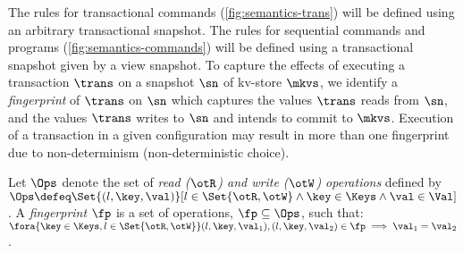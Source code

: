 The rules for transactional commands (\cref{fig:semantics-trans}) will be defined  using an arbitrary 
transactional snapshot. The rules for sequential
commands and programs (\cref{fig:semantics-commands}) will be defined  using a transactional
snapshot given by a view snapshot. 
To capture the effects of executing a transaction $\trans$ on a snapshot $\sn$ of kv-store $\mkvs$, 
we identify a \emph{fingerprint} of $\trans$ on $\sn$ which captures
 the values $\trans$ reads from $\sn$, and
the values $\trans$ writes to $\sn$ and intends to commit to $\mkvs$. 
Execution of a transaction in a given configuration may result in more than one fingerprint due to non-determinism (non-deterministic choice). 

\spaceshrink{-3pt}
\begin{definition}[Fingerprints]
\label{beebop}
\label{def:fingerprint}
Let \( \Ops\) denote the set of \emph{read (\( \otR\)) and write (\(\otW\)) operations} defined by 
$\Ops \defeq \Set{(l, \key, \val) }[ l \in \Set{\otR, \otW} \land \key \in \Keys \land \val \in \Val ]$.
A \emph{fingerprint} $\fp$ is a set of operations, $\fp \subseteq \Ops$,
such that: 
$\fora{\key \in \Keys, l  \in \Set{\otR, \otW}}
	(l, \key, \val_1), (l, \key, \val_2) \in \fp \implies \val_1 = \val_2$.
\end{definition}
\spaceshrink{-3pt}

